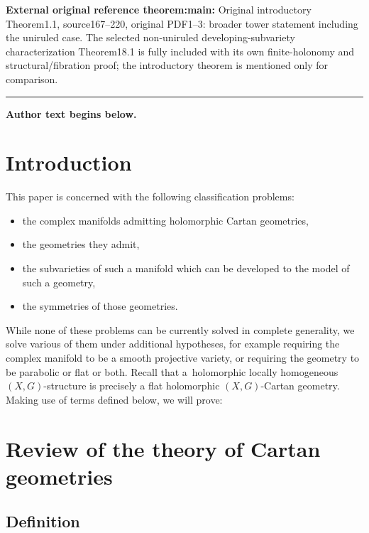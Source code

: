 \documentclass[11pt]{article}
\numberwithin{equation}{section}
\numberwithin{equation}{section}
\begin{document}
\noindent\textbf{External original reference theorem:main:} Original introductory Theorem1.1, source167–220, original PDF1–3: broader tower statement including the uniruled case. The selected non-uniruled developing-subvariety characterization Theorem18.1 is fully included with its own finite-holonomy and structural/fibration proof; the introductory theorem is mentioned only for comparison.\par
\medskip\hrule\medskip\noindent\textbf{Author text begins below.}\par

\section{Introduction}

This paper is concerned with the following classification problems:
\begin{itemize}\itemsep=0pt
\item
the complex manifolds admitting holomorphic Cartan geometries,
\item
the geometries they admit,
\item
the subvarieties of such a manifold which can be developed to the model of such a geometry,
\item
the symmetries of those geometries.
\end{itemize}
While none of these problems can be currently solved in complete generality, we solve various of them under additional hypotheses, for example requiring the complex manifold to be a smooth projective variety, or requiring the geometry to be parabolic or flat or both.
Recall that a~holomorphic locally homogeneous $(X, G)$-structure is precisely a flat holomorphic $(X, G)$-Cartan geometry.
Making use of terms defined below, we will prove:

\setcounter{section}{3}
\section{Review of the theory of Cartan geometries}\label{section:review}

\subsection{Definition}
\end{document}
